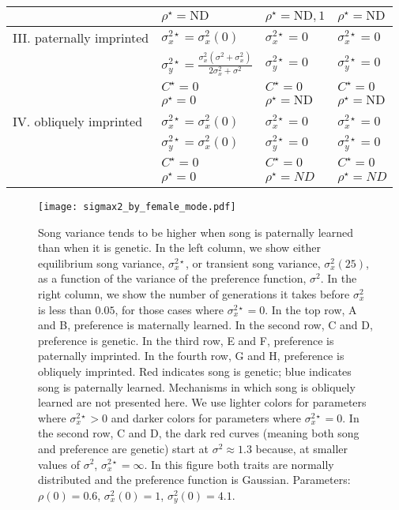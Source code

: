 \documentclass[12pt]{article}
\begin{document}
\begin{landscape}
\begin{table}
\begin{tabular}{|l|l|l|l|}
\\ & $\rho^\star=\text{ND}$ & $\rho^\star=\text{ND},1$ & $\rho^\star=\text{ND}$         
\\\hline III. paternally imprinted & $\sigma_x^{2\star}=\sigma_x^2(0)$ & $\sigma_x^{2\star}=0$  & $\sigma_x^{2\star}=0$                       
\\  			& $\sigma_y^{2\star}=\frac{\sigma_x^2(\sigma^2+\sigma_x^2)}{2\sigma_x^2+\sigma^2}$	  & $\sigma_y^{2\star}=0$  & $\sigma_y^{2\star}=0$                       
\\ & $ C^\star=0$ & $ C^\star=0$ & $ C^\star=0$
\\ & $\rho^\star=0$ & $\rho^\star=\text{ND}$ & $\rho^\star=\text{ND}$
\\ \hline IV. obliquely imprinted & $\sigma_x^{2\star}=\sigma_x^2(0)$ & $\sigma_x^{2\star}=0$ & $\sigma_x^{2\star}=0$
\\ & $\sigma_y^{2\star}=\sigma_x^2(0)$ & $\sigma_y^{2\star}=0$ & $\sigma_y^{2\star}=0$
\\ & $C^\star=0$ & $C^\star=0$ & $C^\star=0$
\\ & $\rho^\star=0$ & $\rho^\star=ND$ & $\rho^\star=ND$
\\\hline
\end{tabular}
\end{table}
\end{landscape}


\begin{figure}
\texttt{[image: sigmax2\_by\_female\_mode.pdf]}
\caption{\label{sigmax2_sigma2}  Song variance tends to be higher when song is paternally learned than when it is genetic. In the left column, we show either equilibrium song variance, $\sigma_x^{2\star}$, or transient song variance, $\sigma_x^2(25)$, as a function of the variance of the preference function, $\sigma^2$. In the right column, we show the number of generations it takes before $\sigma_x^2$ is less than $0.05$, for those cases where $\sigma_x^{2\star}=0$. In the top row, A and B, preference is maternally learned. In the second row, C and D, preference is genetic. In the third row, E and F, preference is paternally imprinted. In the fourth row, G and H, preference is obliquely imprinted. Red indicates song is genetic; blue indicates song is paternally learned. Mechanisms in which song is obliquely learned are not presented here. We use lighter colors for parameters where $\sigma_x^{2\star}>0$ and darker colors for parameters where $\sigma_x^{2\star}=0$. In the second row, C and D, the dark red curves (meaning both song and preference are genetic) start at $\sigma^2\approx 1.3$ because, at smaller values of $\sigma^2$, $\sigma_x^{2\star}=\infty$. In this figure both traits are normally distributed and the preference function is Gaussian.  Parameters: $\rho(0)=0.6$, $\sigma_x^2(0)=1$, $\sigma_y^2(0)=4.1$. }
\end{figure}
\end{document}
